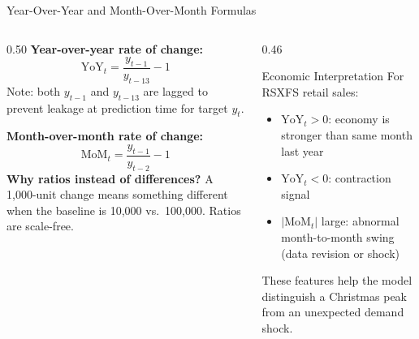 \documentclass[aspectratio=169, 10pt]{beamer}
\begin{document}
\begin{frame}{Year-Over-Year and Month-Over-Month Formulas}
  \begin{columns}[T]
    \begin{column}{0.50\textwidth}
      \textbf{Year-over-year rate of change:}
      \[
        \text{YoY}_t
          = \frac{y_{t-1}}{y_{t-13}} - 1
      \]
      Note: both $y_{t-1}$ and $y_{t-13}$ are lagged to
      prevent leakage at prediction time for target $y_t$.

      \medskip
      \textbf{Month-over-month rate of change:}
      \[
        \text{MoM}_t
          = \frac{y_{t-1}}{y_{t-2}} - 1
      \]
      \textbf{Why ratios instead of differences?}
      A 1,000-unit change means something different when
      the baseline is 10,000 vs.\ 100,000.
      Ratios are scale-free.
    \end{column}
    \begin{column}{0.46\textwidth}
      \begin{definitionbox}{Economic Interpretation}
        \footnotesize
        For RSXFS retail sales:
        \begin{itemize}
          \item $\text{YoY}_t > 0$: economy is stronger
                than same month last year
          \item $\text{YoY}_t < 0$: contraction signal
          \item $|\text{MoM}_t|$ large: abnormal
                month-to-month swing (data revision or
                shock)
        \end{itemize}
        These features help the model distinguish a
        Christmas peak from an unexpected demand shock.
      \end{definitionbox}

      \medskip
    \end{column}
  \end{columns}
\end{frame}
\end{document}
